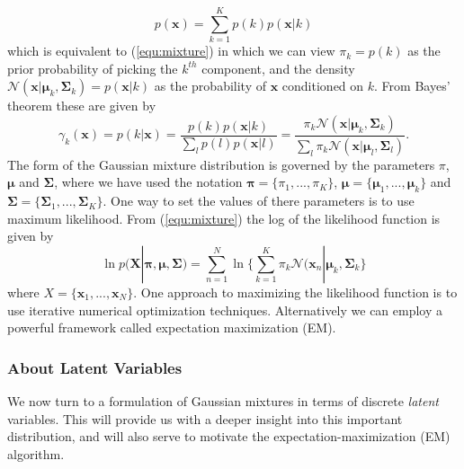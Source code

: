 ﻿\documentclass[a4paper, 11pt]{article}
\numberwithin{equation}{subsection}
\begin{document}
\begin{equation}
p(\mathbf x)=\sum_{k=1}^K p(k)p(\mathbf x|k)
\end{equation}
which is equivalent to (\ref{equ:mixture}) in which we can view $\pi_k=p(k)$ as the prior probability of picking the $k^{th}$ component, and the density $\mathcal N(\mathbf x|\boldsymbol\mu_k,\boldsymbol\Sigma_k)= p(\mathbf x|k)$ as the probability of $\mathbf x$ conditioned on $k$. From Bayes' theorem these are given by
\begin{equation}
\gamma_k(\mathbf x)=p(k|\mathbf x)=\frac{p(k)p(\mathbf x|k)}{\sum_lp(l)p(\mathbf x|l)}=\frac{\pi_k\mathcal N(\mathbf x|\boldsymbol\mu_k,\boldsymbol\Sigma_k)}{\boldsymbol\sum_l\pi_k\mathcal N(\mathbf x|\boldsymbol\mu_l,\boldsymbol\Sigma_l)}.
\end{equation}
The form of the Gaussian mixture distribution is governed by the parameters $\pi$, $\boldsymbol\mu$ and $\boldsymbol\Sigma$, where we have used the notation $\boldsymbol\pi=\{\pi_1,...,\pi_K\}$, $\boldsymbol\mu=\{\boldsymbol\mu_1,...,\boldsymbol\mu_k\}$ and $\boldsymbol\Sigma=\{\boldsymbol\Sigma_1,...,\boldsymbol\Sigma_K\}$. One way to set the values of there parameters is to use maximum likelihood. From (\ref{equ:mixture}) the log of the likelihood function is given by 
\begin{equation}
\ln p(\mathbf X|\boldsymbol\pi,\boldsymbol\mu,\boldsymbol\Sigma)=\sum_{n=1}^N\ln\{\sum_{k=1}^K\pi_k\mathcal N(\mathbf x_n|\boldsymbol\mu_k,\boldsymbol\Sigma_k\}
\end{equation}
where $X = \{\mathbf x_1,...,\mathbf x_N\}$. One approach to maximizing the likelihood function is to use iterative numerical optimization techniques. Alternatively we can employ a powerful framework called expectation maximization (EM).

\subsubsection{About Latent Variables}
We now turn to a formulation of Gaussian mixtures in terms of discrete \emph{latent} variables. This will provide us with a deeper insight into this important distribution, and will also serve to motivate the expectation-maximization (EM) algorithm.
\end{document}

